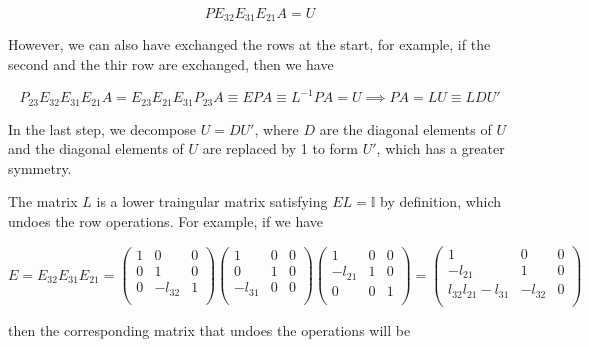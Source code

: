 \documentclass[a4paper,12pt]{report}
\begin{document}
\begin{equation}
    PE_{32}E_{31}E_{21}A = U
\end{equation}

However, we can also have exchanged the rows at the start, for example, if the second and the thir row are exchanged, then we have 

\begin{equation}
    P_{23}E_{32}E_{31}E_{21}A = E_{23}E_{21}E_{31}P_{23}A \equiv EPA \equiv L^{-1} PA = U \implies PA=LU \equiv LDU'     
\end{equation}

In the last step, we decompose \(U = DU'\), where \(D\) are the diagonal elements of \(U\) and the diagonal elements of \(U\) are replaced by 1 to form \(U'\), which has a greater symmetry.  

The matrix \(L\) is a lower traingular matrix satisfying \(EL = \mathbb{I}\) by definition, which undoes the row operations. For example, if we have 

\begin{equation}
    E = E_{32}E_{31}E_{21}    = \begin{pmatrix}
        1 & 0 &  0 \\
        0 & 1 &  0 \\
        0 & -l_{32}  &  1 \\
    \end{pmatrix}\begin{pmatrix}
        1 & 0 &  0 \\
        0 & 1 &  0 \\
        -l_{31}  & 0 &  0 \\
    \end{pmatrix}\begin{pmatrix}
        1 & 0 &  0 \\
        -l_{21} & 1 &  0 \\
        0 & 0 &  1 \\
    \end{pmatrix} = \begin{pmatrix}
        1 & 0 &  0 \\
        -l_{21}  & 1 &  0 \\
        l_{32}l_{21}-l_{31} & -l_{32}  &  0 \\
    \end{pmatrix}
\end{equation}

then the corresponding matrix that undoes the operations will be 
\end{document}
